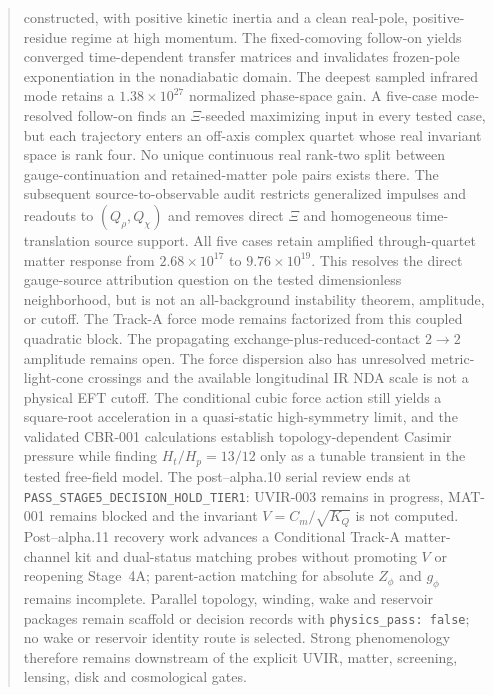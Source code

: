 ﻿\documentclass[11pt]{article}
\begin{document}
\begin{abstract}
constructed, with positive kinetic inertia and a clean real-pole,
positive-residue regime at high momentum.  The fixed-comoving follow-on yields
converged time-dependent transfer matrices and invalidates frozen-pole
exponentiation in the nonadiabatic domain.  The deepest sampled infrared mode
retains a $1.38\times10^{27}$ normalized phase-space gain.  A five-case
mode-resolved follow-on finds an $\Xi$-seeded maximizing input in every tested
case, but each trajectory enters an off-axis complex quartet whose real
invariant space is rank four.  No unique continuous real rank-two split
between gauge-continuation and retained-matter pole pairs exists there.  The
subsequent source-to-observable audit restricts generalized impulses and
readouts to $(Q_\rho,Q_\chi)$ and removes direct $\Xi$ and homogeneous
time-translation source support.  All five cases retain amplified
through-quartet matter response from $2.68\times10^{17}$ to
$9.76\times10^{19}$.  This resolves the direct gauge-source attribution
question on the tested dimensionless neighborhood, but is not an
all-background instability theorem, amplitude, or cutoff.  The Track-A force
mode remains factorized from this coupled quadratic block.  The propagating
exchange-plus-reduced-contact $2\to2$ amplitude remains open.  The
force dispersion also has
unresolved metric-light-cone crossings and the available longitudinal IR NDA
scale is not a physical EFT cutoff.  The conditional cubic force action still
yields a
square-root acceleration in a quasi-static high-symmetry limit, and the
validated CBR-001 calculations establish topology-dependent Casimir pressure
while finding $H_t/H_p=13/12$ only as a tunable transient in the tested
free-field model.  The post--alpha.10 serial review ends at
\texttt{PASS\_STAGE5\_DECISION\_HOLD\_TIER1}: UVIR-003 remains in progress,
MAT-001 remains blocked and the invariant $V=C_m/\sqrt{K_Q}$ is not computed.
Post--alpha.11 recovery work advances a Conditional Track-A matter-channel
kit and dual-status matching probes without promoting $V$ or reopening
Stage~4A; parent-action matching for absolute $Z_\phi$ and $g_\phi$ remains
incomplete.  Parallel topology, winding, wake and reservoir packages remain
scaffold or decision records with \texttt{physics\_pass: false}; no wake or
reservoir identity route is selected.  Strong phenomenology therefore remains
downstream of the explicit UVIR, matter, screening, lensing, disk and
cosmological gates.
\end{abstract}

\tableofcontents
\end{document}
